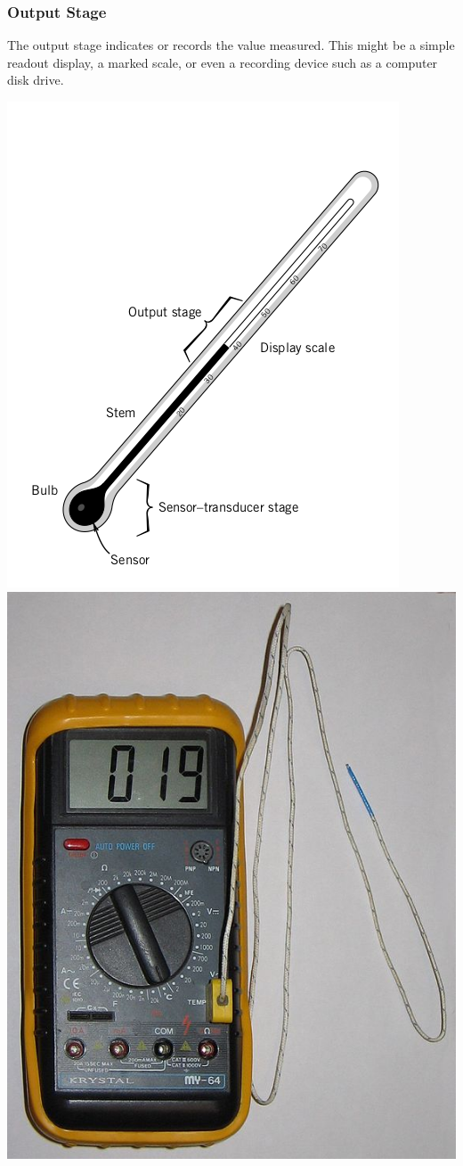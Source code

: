 \documentclass[fleqn]{beamer} %
\begin{document}
\begin{frame}
\frametitle{Output Stage}
The {\BR output stage} indicates or records the value measured. This might be a simple readout
display, a marked scale, or even a recording device such as a computer disk drive.

\includegraphics[scale=0.25]{bulb_thermometer.png} \hspace{10mm}\includegraphics[scale=0.3]{thermocouple.jpg}


\end{frame}
\end{document}

